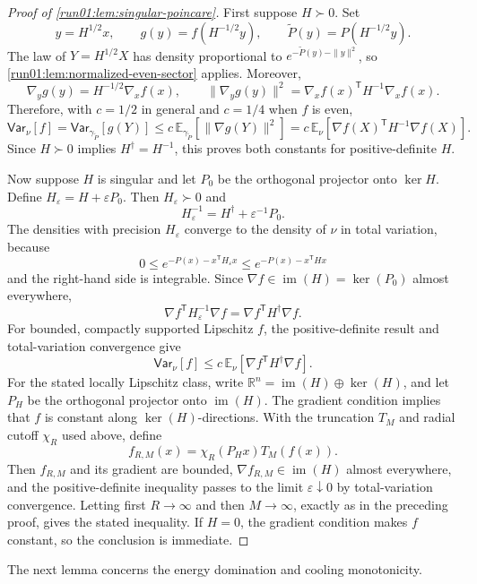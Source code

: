 \documentclass[11pt]{article}
\numberwithin{equation}{section}
\theoremstyle{definition}
\newcommand{\E}[2]{\mathbb{E}_{#1}\left[#2\right]}
\newcommand{\V}[2]{\mathsf{Var}_{#1}\left[#2\right]}
\begin{document}
\begin{proof}[Proof of \cref{run01:lem:singular-poincare}]
First suppose $H\succ0$.
Set
\[
y=H^{1/2}x,
\qquad
g(y)=f(H^{-1/2}y),
\qquad
\widetilde P(y)=P(H^{-1/2}y).
\]
The law of $Y=H^{1/2}X$ has density proportional to
$e^{-\widetilde P(y)-\|y\|^2}$, so \cref{run01:lem:normalized-even-sector}
applies.
Moreover,
\[
\nabla_y g(y)=H^{-1/2}\nabla_x f(x),
\qquad
\|\nabla_y g(y)\|^2 =\nabla_x f(x)^{\mathsf T}H^{-1}\nabla_x f(x).
\]
Therefore, with $c=1/2$ in general and
$c=1/4$ when
$f$ is even,
\[
\V{\nu}{f}
=\V{\gamma_{\widetilde P}}{g(Y)}
\leq c\,\E{\gamma_{\widetilde P}}{\|\nabla g(Y)\|^2}
=c\,\E{\nu} {\nabla f(X)^{\mathsf T}H^{-1}\nabla f(X)}.
\]
Since $H\succ0$ implies
$H^\dagger=H^{-1}$, this proves both constants for positive-definite
$H$.

Now suppose $H$ is singular and let
$P_0$ be the orthogonal projector onto
$\ker H$.
Define $H_\varepsilon=H+\varepsilon P_0$.
Then $H_\varepsilon\succ0$ and
\[
 H_\varepsilon^{-1}=H^\dagger+\varepsilon^{-1}P_0.
\]
The densities with precision $H_\varepsilon$ converge to the density of
$\nu$ in total variation, because
\[
0
\leq e^{-P(x)-x^{\mathsf T}H_\varepsilon x}
\leq e^{-P(x)-x^{\mathsf T}Hx}
\]
and the right-hand side is integrable.
Since $\nabla f\in\operatorname{im}(H)=\ker(P_0)$ almost everywhere,
\[
 \nabla f^{\mathsf T}H_\varepsilon^{-1}\nabla f
 =\nabla f^{\mathsf T}H^\dagger\nabla f.
\]
For bounded, compactly supported Lipschitz $f$, the positive-definite result and
total-variation convergence give
\[
 \V{\nu}{f}
 \leq c\,\E{\nu}
 {\nabla f^{\mathsf T}H^\dagger\nabla f}.
\]
For the stated locally Lipschitz class, write
$\mathbb R^n=\operatorname{im}(H)\oplus\ker(H)$, and let
$P_H$ be the orthogonal projector onto
$\operatorname{im}(H)$.
The gradient condition implies that $f$ is constant along
$\ker(H)$-directions.
With the truncation $T_M$ and radial cutoff
$\chi_R$ used above, define
\[
 f_{R,M}(x)=\chi_R(P_Hx)T_M(f(x)).
\]
Then $f_{R,M}$ and its gradient are bounded,
$\nabla f_{R,M}\in\operatorname{im}(H)$ almost everywhere, and the
positive-definite inequality passes to the limit
$\varepsilon\downarrow0$ by total-variation convergence.
Letting first $R\to\infty$ and then
$M\to\infty$, exactly as in the preceding proof, gives the stated inequality.
If $H=0$, the gradient condition makes
$f$ constant, so the conclusion is immediate.
\end{proof}
\space The next lemma concerns the energy domination and cooling monotonicity.
\end{document}
